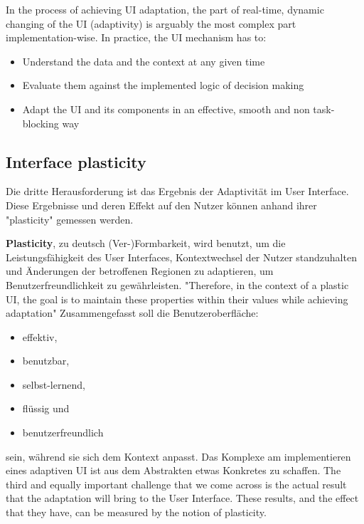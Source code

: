In the process of achieving UI adaptation, the part of real-time, dynamic changing of the UI (adaptivity) is arguably the
most complex part implementation-wise. In practice, the UI mechanism has to:
\begin{itemize}
    \item Understand the data and the context at any given time
    \item Evaluate them against the implemented logic of decision making
    \item Adapt the UI and its components in an effective, smooth and non task-blocking way
\end{itemize}

\subsection{Interface plasticity} %
Die dritte Herausforderung ist das Ergebnis der Adaptivität im User Interface. Diese Ergebnisse und deren Effekt auf den Nutzer 
können anhand ihrer "plasticity" gemessen werden.

\textbf{Plasticity}, zu deutsch (Ver-)Formbarkeit, wird benutzt, um die Leistungsfähigkeit des User Interfaces, 
Kontextwechsel der Nutzer standzuhalten und Änderungen der betroffenen Regionen zu adaptieren, 
um Benutzerfreundlichkeit zu gewährleisten.
"Therefore, in the context of a plastic UI, the goal is to maintain these properties within their values while achieving adaptation"
Zusammengefasst soll die Benutzeroberfläche:
\begin{itemize}
    \item effektiv,
    \item benutzbar,
    \item selbst-lernend,
    \item flüssig und
    \item benutzerfreundlich
\end{itemize}
sein, während sie sich dem Kontext anpasst. Das Komplexe am implementieren eines adaptiven UI ist aus dem Abstrakten 
etwas Konkretes zu schaffen.
The third and equally important challenge that we come across is the actual result that the adaptation will bring to the User Interface.
These results, and the effect that they have, can be measured by the notion of plasticity.

